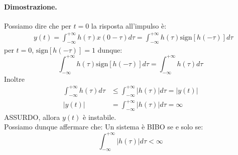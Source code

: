 \paragraph{Dimostrazione. } Possiamo dire che per $t = 0$ la risposta all'impulso è:
\begin{align*}
    &y(t) = \int_{-\infty}^{+\infty} h(\tau) x(0 -\tau) d\tau =  \int_{-\infty}^{+\infty} h(\tau)\mbox{sign}[h(-\tau)] d\tau
\end{align*}
per $t = 0$, $\mbox{sign}[h(-\tau)] = 1$ dunque:
\begin{equation*}
    \int_{-\infty}^{+\infty} h(\tau)\mbox{sign}[h(-\tau)] d\tau = \int_{-\infty}^{+\infty} h(\tau) d\tau
\end{equation*}
Inoltre
\begin{align*}
    \int_{-\infty}^{+\infty} h(\tau) d\tau &\leq \int_{-\infty}^{+\infty} |h(\tau)| d\tau = |y(t)| \\
    |y(t)| &= \int_{-\infty}^{+\infty} |h(\tau)| d\tau = \infty
\end{align*}
ASSURDO, allora $y(t)$ è instabile.\\Possiamo dunque affermare che:
Un sistema è BIBO se e solo se:
\begin{equation}
    \int_{-\infty}^{+\infty} |h(\tau)| d\tau < \infty
\end{equation}

